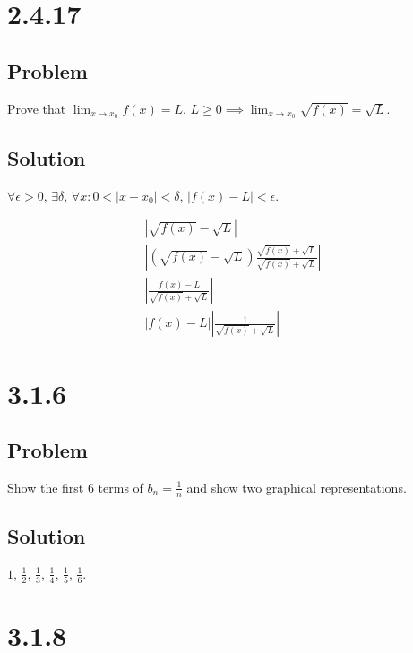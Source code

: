 \documentclass[12pt]{article}
\newcommand{\round}[1]{\left(       #1 \right)      }
\newcommand{\abs}  [1]{\left|       #1 \right|      }
\begin{document}
\section*{2.4.17}

\subsection*{Problem}

Prove that $\lim_{x \to x_0} f(x) = L$, $L \geq 0 \implies \lim_{x \to x_0} \sqrt{f(x)} = \sqrt{L}$.

\subsection*{Solution}

$\forall \epsilon > 0$, $\exists \delta$, $\forall x : 0 < \abs{x - x_0} < \delta$, $\abs{f(x) - L} < \epsilon$.

\begin{align}
    \abs{\sqrt{f(x)} - \sqrt{L}} \\
    \abs{\round{\sqrt{f(x)} - \sqrt{L}} \frac{\sqrt{f(x)} + \sqrt{L}}{\sqrt{f(x)} + \sqrt{L}}} \\
    \abs{\frac{f(x) - L}{\sqrt{f(x)} + \sqrt{L}}} \\
    \abs{f(x) - L} \abs{\frac{1}{\sqrt{f(x)} + \sqrt{L}}}
\end{align}



\section*{3.1.6}

\subsection*{Problem}

Show the first 6 terms of $b_n = \frac{1}{n}$ and show two graphical representations.

\subsection*{Solution}

$1$, $\frac{1}{2}$, $\frac{1}{3}$, $\frac{1}{4}$, $\frac{1}{5}$, $\frac{1}{6}$.



\section*{3.1.8}
\end{document}
